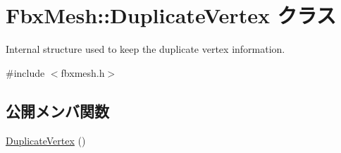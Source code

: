 \hypertarget{class_fbx_mesh_1_1_duplicate_vertex}{}\section{Fbx\+Mesh\+:\+:Duplicate\+Vertex クラス}
\label{class_fbx_mesh_1_1_duplicate_vertex}


Internal structure used to keep the duplicate vertex information.  




{\ttfamily \#include $<$fbxmesh.\+h$>$}

\subsection*{公開メンバ関数}
\begin{DoxyCompactItemize}
\item 
\hyperlink{class_fbx_mesh_1_1_duplicate_vertex_ab282bd63e5da364fa288e90b1590d0bc}{Duplicate\+Vertex} ()
\end{DoxyCompactItemize}

